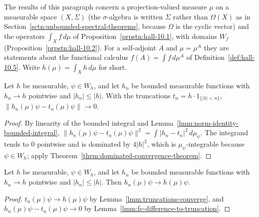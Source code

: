 The results of this paragraph concern a projection-valued measure $\mu$ on a measurable space $(X, \Sigma)$ (the $\sigma$-algebra is written $\Sigma$ rather than $\Omega(X)$ as in Section~\ref{sctn:unbounded-spectral-theorems}, because $\Omega$ is the cyclic vector) and the operators $\int_X f \, d\mu$ of Proposition~\ref{prpstn:hall-10.1}, with domains $W_f$ (Proposition~\ref{prpstn:hall-10.2}). For a self-adjoint $A$ and $\mu = \mu^A$ they are statements about the functional calculus $f(A) = \int f \, d\mu^A$ of Definition~\ref{def:hall-10.5}. Write $h(\mu) = \int_X h \, d\mu$ for short.

\begin{lemma}
    \label{lmm:fc-difference-to-truncation}
    \leanok
    Let $h$ be measurable, $\psi \in W_h$, and let $h_n$ be bounded measurable functions with $h_n \to h$ pointwise and $|h_n| \le |h|$. With the truncations $t_n = h \cdot 1_{\{|h| < n\}}$, $\|h_n(\mu)\psi - t_n(\mu)\psi\| \to 0$.
\end{lemma}
\begin{proof}
    \leanok
    By linearity of the bounded integral and Lemma~\ref{lmm:norm-identity-bounded-integral}, $\|h_n(\mu)\psi - t_n(\mu)\psi\|^2 = \int |h_n - t_n|^2 \, d\mu_\psi$. The integrand tends to $0$ pointwise and is dominated by $4|h|^2$, which is $\mu_\psi$-integrable because $\psi \in W_h$; apply Theorem~\ref{thrm:dominated-convergence-theorem}.
\end{proof}

\begin{lemma}
    \label{lmm:fc-dominated-convergence}
    \leanok
    Let $h$ be measurable, $\psi \in W_h$, and let $h_n$ be bounded measurable functions with $h_n \to h$ pointwise and $|h_n| \le |h|$. Then $h_n(\mu)\psi \to h(\mu)\psi$.
\end{lemma}
\begin{proof}
    \leanok
    $t_n(\mu)\psi \to h(\mu)\psi$ by Lemma~\ref{lmm:truncations-converge}, and $h_n(\mu)\psi - t_n(\mu)\psi \to 0$ by Lemma~\ref{lmm:fc-difference-to-truncation}.
\end{proof}

